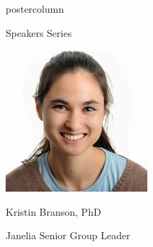 \documentclass{beamer}
\begin{document}
\begin{frame}
\begin{columns}
\begin{column}{.33\textwidth}
\begin{beamercolorbox}[center,wd=\textwidth]{postercolumn}
\begin{minipage}[T]{.95\textwidth}
{\begin{myblock}{Speakers Series}
\begin{addmargin}[1em]{1em}
\begin{minipage}{0.49\linewidth}
                    \includegraphics[width=\linewidth]{img/kristin.jpg}
                    \centerline{Kristin Branson, PhD}\newline
                    \centerline{Janelia Senior Group Leader}
                \end{minipage}
            \end{addmargin}
            \vspace{1cm}
          \end{myblock}\vspace{1.25cm}
		}\end{minipage}\end{beamercolorbox}
	\end{column}
\end{columns}
\end{frame}
\end{document}
